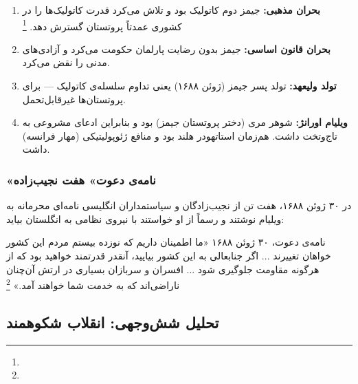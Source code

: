 \begin{enumerate}[nosep, label=\textbf{\arabic*.}]
  \item \textbf{بحران مذهبی:} جیمز دوم کاتولیک بود و تلاش می‌کرد قدرت کاتولیک‌ها را در کشوری عمدتاً پروتستان گسترش دهد.%
  \footnote{}
  \item \textbf{بحران قانون اساسی:} جیمز بدون رضایت پارلمان حکومت می‌کرد و آزادی‌های مدنی را نقض می‌کرد.
  \item \textbf{تولد ولیعهد:} تولد پسر جیمز (ژوئن ۱۶۸۸) یعنی تداوم سلسله‌ی کاتولیک — برای پروتستان‌ها غیرقابل‌تحمل.
  \item \textbf{ویلیام اورانژ:} شوهر مری (دختر پروتستان جیمز) بود و بنابراین ادعای مشروعی به تاج‌وتخت داشت. هم‌زمان استاتهودر هلند بود و منافع ژئوپولیتیکی (مهار فرانسه) داشت.
\end{enumerate}

\subsubsection{«نامه‌ی دعوت» هفت نجیب‌زاده}

در ۳۰ ژوئن ۱۶۸۸، هفت تن از نجیب‌زادگان و سیاستمداران انگلیسی نامه‌ای محرمانه به ویلیام نوشتند و رسماً از او خواستند با نیروی نظامی به انگلستان بیاید:

\begin{histQuote}{نامه‌ی دعوت، ۳۰ ژوئن ۱۶۸۸}
«ما اطمینان داریم که نوزده بیستم مردم این کشور خواهان تغییرند ... اگر جنابعالی به این کشور بیایید، آنقدر قدرتمند خواهید بود که از هرگونه مقاومت جلوگیری شود ... افسران و سربازان بسیاری در ارتش آن‌چنان ناراضی‌اند که به خدمت شما خواهند آمد.»%
\footnote{}
\end{histQuote}

\subsection{تحلیل شش‌وجهی: انقلاب شکوهمند}
\label{subsec:ch08-glorious-analysis}

